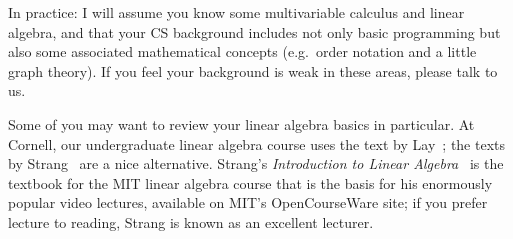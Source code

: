 In practice: I will assume you know some multivariable calculus
and linear algebra, and that your CS background includes not only
basic programming but also some associated mathematical concepts
(e.g.~order notation and a little graph theory).  If you feel your
background is weak in these areas, please talk to us.

Some of you may want to review your linear algebra basics in particular.
At Cornell, our undergraduate linear algebra course uses the text
by Lay~\cite{Lay:2016:Linear}; the texts by Strang~\cite{Strang:2006:Linear,Strang:2009:Introduction} are a nice
alternative.  Strang's {\em Introduction to Linear Algebra}~\cite{Strang:2009:Introduction} is the textbook for the MIT
linear algebra course that is the basis for his enormously popular
video lectures, available on MIT's OpenCourseWare site; if you prefer
lecture to reading, Strang is known as an excellent lecturer.
